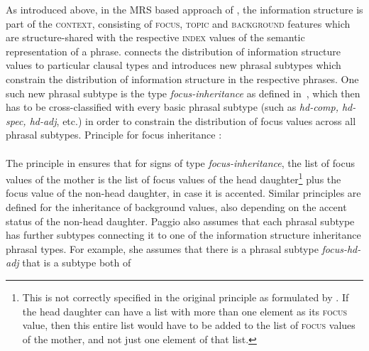 \documentclass[output=paper,biblatex,babelshorthands,newtxmath,draftmode,colorlinks,citecolor=brown]{langscibook}
\begin{document}
As introduced above, in the MRS based approach of \citet{Paggio2009a-u}, the
information structure is part of the \textsc{context}, consisting of
\textsc{focus}, \textsc{topic} and \textsc{background} features which
are structure-shared with the respective \textsc{index} values of the
semantic representation of a phrase. \citet{Paggio2009a-u} connects the
distribution of information structure values to particular clausal
types and introduces new phrasal subtypes which constrain the
distribution of information structure in the respective phrases. One
such new phrasal subtype is the type
\textit{focus-inheritance} as defined in~, which then has to be cross-classified
with every basic phrasal subtype (such as \textit{hd-comp, hd-spec,
  hd-adj}, etc.) in order to constrain the distribution of focus
values across all phrasal subtypes.
\ea
Principle for focus inheritance \citep[155]{Paggio2009a-u}:\\
   \impl \\
    \label{fig:focus-inheritance}
    \z
The principle in  ensures that for
signs of type \textit{focus-inheritance}, the list of focus values
of the mother is the list of focus values of the head
daughter\footnote{This is not correctly specified in the original
principle as formulated by \citet{Paggio2009a-u}. If the
head daughter can have a list with more than one element as its
\textsc{focus} value, then this entire list would have to be
added to the list of \textsc{focus} values of the mother, and
not just one element of that list.} plus the focus value of
the non-head daughter, in case it is accented. Similar principles
are defined for the inheritance of background values, also
depending on the accent status of the non-head daughter. Paggio
also assumes that each phrasal subtype has further subtypes
connecting it to one of the information structure inheritance
phrasal types. For example, she assumes that there is a phrasal
subtype \textit{focus-hd-adj} that is a subtype both of
\end{document}
